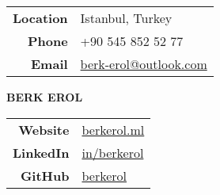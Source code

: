 \documentclass[a4paper, 10pt]{article}
\begin{document}
{\setlength{\tabcolsep}{0.1cm}
\begin{tabular}{r l}
    \textbf{Location} & Istanbul, Turkey\\
    \textbf{Phone} & +90 545 852 52 77\\
    \textbf{Email} & \href{mailto:berk-erol@outlook.com}{berk-erol@outlook.com}
\end{tabular}
\hspace{1.05cm} {\Huge \textbf{BERK EROL}} \hspace{2.85cm}
\begin{tabular}{r l}
    \textbf{Website} & \href{https://berkerol.ml}{berkerol.ml}\\
    \textbf{LinkedIn} & \href{https://www.linkedin.com/in/berkerol}{in/berkerol}\\
    \textbf{GitHub} & \href{https://github.com/berkerol}{berkerol}
\end{tabular}}
\end{document}

